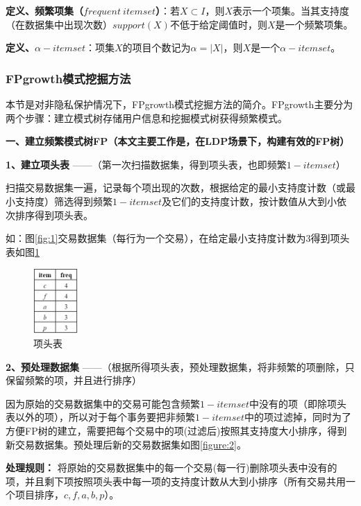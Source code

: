 \documentclass[UTF8,a4paper]{ctexart}
\begin{document}
  \textbf{定义、频繁项集（$frequent\  itemset$）}：若$X\subset I$，则$X$表示一个项集。当其支持度（在数据集中出现次数）$support(X)$不低于给定阈值时，则$X$是一个频繁项集。

  \textbf{定义、$\alpha-itemset$}：项集$X$的项目个数记为$\alpha = \left | X \right |$，则$X$是一个$\alpha - itemset$。

  \subsubsection{FPgrowth模式挖掘方法\cite{han2000mining}}
  \label{fpgrowth}
  本节是对非隐私保护情况下，FPgrowth模式挖掘方法的简介。FPgrowth主要分为两个步骤：建立模式树存储用户信息和挖掘模式树获得频繁模式。

  \textbf{一、建立频繁模式树FP（本文主要工作是，在LDP场景下，构建有效的FP树）}

  \textbf{1、建立项头表} ——（第一次扫描数据集，得到项头表，也即频繁$1-itemset$）

  扫描交易数据集一遍，记录每个项出现的次数，根据给定的最小支持度计数（或最小支持度）筛选得到频繁$1-itemset$及它们的支持度计数，按计数值从大到小依次排序得到项头表。

  如：图\ref{fig:1}交易数据集（每行为一个交易），在给定最小支持度计数为3得到项头表如图\ref{fig:item_table}


  \begin{figure}[htbp]
    \centering
    \includegraphics[width=0.15\textwidth]{item_table}
    \caption{项头表}
    \label{fig:item_table}
  \end{figure}

  \textbf{2、预处理数据集} ——（根据所得项头表，预处理数据集，将非频繁的项删除，只保留频繁的项，并且进行排序）
  
  因为原始的交易数据集中的交易可能包含频繁$1-itemset$中没有的项（即除项头表以外的项），所以对于每个事务要把非频繁$1-itemset$中的项过滤掉，同时为了方便FP树的建立，需要把每个交易中的项(过滤后)按照其支持度大小排序，得到新交易数据集。预处理后新的交易数据集如图\ref{figure:2}。

  \textbf{处理规则：}                                                            将原始的交易数据集中的每一个交易(每一行)删除项头表中没有的项，并且剩下项按照项头表中每一项的支持度计数从大到小排序（所有交易共用一个项目排序，$c,f,a,b,p$）。
\end{document}
